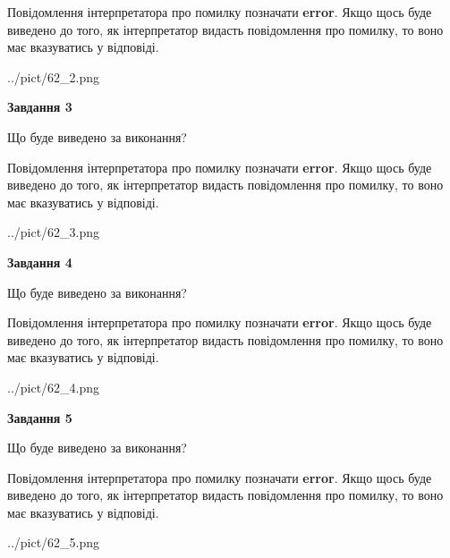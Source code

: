 \documentclass[12pt, ukrainian]{article}
\begin{document}
{\begin {large}
Повідомлення інтерпретатора про помилку позначати \textbf{error}.
Якщо щось буде виведено до того, як інтерпретатор видасть повідомлення про помилку, 
то воно має вказуватись у відповіді. \par


\begin{center}
	{../pict/62_2.png}
\end{center}
\newpage

{\begin {center}\textbf{Завдання 3}\end {center}}\par
Що буде виведено за виконання?

Повідомлення інтерпретатора про помилку позначати \textbf{error}.
Якщо щось буде виведено до того, як інтерпретатор видасть повідомлення про помилку, 
то воно має вказуватись у відповіді. \par


\begin{center}
	{../pict/62_3.png}
\end{center}
\newpage

{\begin {center}\textbf{Завдання 4}\end {center}}\par
Що буде виведено за виконання?

Повідомлення інтерпретатора про помилку позначати \textbf{error}.
Якщо щось буде виведено до того, як інтерпретатор видасть повідомлення про помилку, 
то воно має вказуватись у відповіді. \par


\begin{center}
	{../pict/62_4.png}
\end{center}
\newpage

{\begin {center}\textbf{Завдання 5}\end {center}}\par
Що буде виведено за виконання?

Повідомлення інтерпретатора про помилку позначати \textbf{error}.
Якщо щось буде виведено до того, як інтерпретатор видасть повідомлення про помилку, 
то воно має вказуватись у відповіді. \par


\begin{center}
	{../pict/62_5.png}
\end{center}
\newpage


\end{large}}
\end{document}
